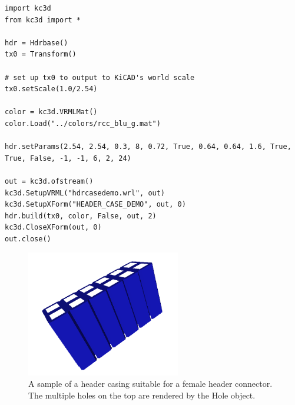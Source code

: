\begin{verbatim}
import kc3d
from kc3d import *

hdr = Hdrbase()
tx0 = Transform()

# set up tx0 to output to KiCAD's world scale
tx0.setScale(1.0/2.54)

color = kc3d.VRMLMat()
color.Load("../colors/rcc_blu_g.mat")

hdr.setParams(2.54, 2.54, 0.3, 8, 0.72, True, 0.64, 0.64, 1.6, True, True, False, -1, -1, 6, 2, 24)

out = kc3d.ofstream()
kc3d.SetupVRML("hdrcasedemo.wrl", out)
kc3d.SetupXForm("HEADER_CASE_DEMO", out, 0)
hdr.build(tx0, color, False, out, 2)
kc3d.CloseXForm(out, 0)
out.close()
\end{verbatim}

\begin{figure}
\label{fig:k3dtools-hdrcase}
\centering
\includegraphics[width = 0.6\textwidth]{img/k3dtools-hdrcase.png}
\caption{A sample of a header casing suitable for a female header connector.
The multiple holes on the top are rendered by the Hole object.}
\end{figure}
